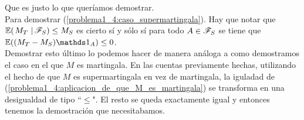 	Que es justo lo que queríamos demostrar.\\
	
	Para demostrar (\ref{problema1_4:caso_supermartingala}). Hay que notar que $ \espc{M_T}{\F_S}\leq M_S $ es cierto sí y sólo sí para todo $A \in \mathscr{F}_S$
	se tiene que $ \E((M_T - M_S) \indic_{A}) \leq 0 $.\\
	
	Demostrar esto último lo podemos hacer de manera análoga a como demostramos el caso en el que $M$ es martingala. En las cuentas previamente hechas,
	utilizando el hecho de que $M$ es supermartingala en vez de martingala, la iguladad de (\ref{problema1_4:aplicacion_de_que_M_es_martingala}) 
	se transforma en una desigualdad de tipo ``$\leq$". El resto se queda exactamente igual y entonces tenemos la demostración que necesitabamos.
	
	
	